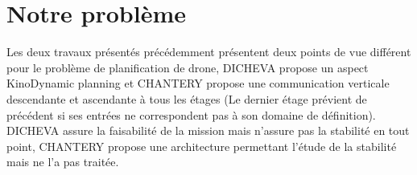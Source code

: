 \documentclass[a4paper,11pt,final]{article}
\theoremstyle{plain}
\theoremstyle{definition}
\theoremstyle{remark}
\begin{document}
  
  \cleardoublepage %
  \tableofcontents %
  \sloppy          %
  
\cleardoublepage




\section{Notre problème}
Les deux travaux présentés précédemment présentent deux points de vue différent pour le problème de planification de drone, DICHEVA propose un aspect KinoDynamic planning et CHANTERY propose une communication verticale descendante et ascendante à tous les étages (Le dernier étage prévient de précédent si ses entrées ne correspondent pas à son domaine de définition).
DICHEVA assure la faisabilité de la mission mais n'assure pas la stabilité en tout point, CHANTERY propose une architecture permettant l'étude de la stabilité mais ne l'a pas traitée.
\end{document}

